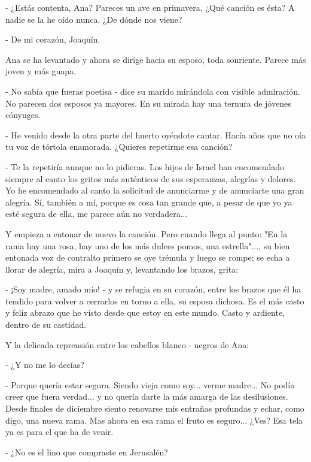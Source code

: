 \documentclass[12pt]{book} %
\begin{document}
- ¿Estás contenta, Ana? Pareces un ave en primavera. ¿Qué canción es ésta? A nadie se la he oído nunca. ¿De dónde nos viene? 

- De mi corazón, Joaquín. 

 Ana se ha levantado y ahora se dirige hacia su esposo, toda sonriente. Parece más joven y más guapa. 

- No sabía que fueras poetisa - dice su marido mirándola con visible admiración. No parecen dos esposos ya mayores. En su mirada hay una ternura de jóvenes cónyuges. 

- He venido desde la otra parte del huerto oyéndote cantar. Hacía años que no oía tu voz de tórtola enamorada. ¿Quieres repetirme esa canción? 

- Te la repetiría aunque no lo pidieras. Los hijos de Israel han encomendado siempre al canto los gritos más auténticos de sus esperanzas, alegrías y dolores. Yo he encomendado al canto la solicitud de anunciarme y de anunciarte una gran alegría. Sí, también a mí, porque es cosa tan grande que, a pesar de que yo ya esté segura de ella, me parece aún no verdadera... 

Y empieza a entonar de nuevo la canción. Pero cuando llega al punto: "En la rama hay una rosa, hay uno de los más dulces pomos, una estrella"..., su bien entonada voz de contralto primero se oye trémula y luego se rompe; se echa a llorar de alegría, mira a Joaquín y, levantando los brazos, grita: 

- ¡Soy madre, amado mío! - y se refugia en su corazón, entre los brazos que él ha tendido para volver a cerrarlos en torno a ella, su esposa dichosa. Es el más casto y feliz abrazo que he visto desde que estoy en este mundo. Casto y ardiente, dentro de su castidad. 

Y la delicada reprensión entre los cabellos blanco - negros de Ana: 

- ¿Y no me lo decías? 

- Porque quería estar segura. Siendo vieja como soy... verme madre... No podía creer que fuera verdad... y no quería darte la más amarga de las desilusiones. Desde finales de diciembre siento renovarse mis entrañas profundas y echar, como digo, una nueva rama. Mas ahora en esa rama el fruto es seguro... ¿Ves? Esa tela ya es para el que ha de venir. 

- ¿No es el lino que compraste en Jerusalén? 
\end{document}
